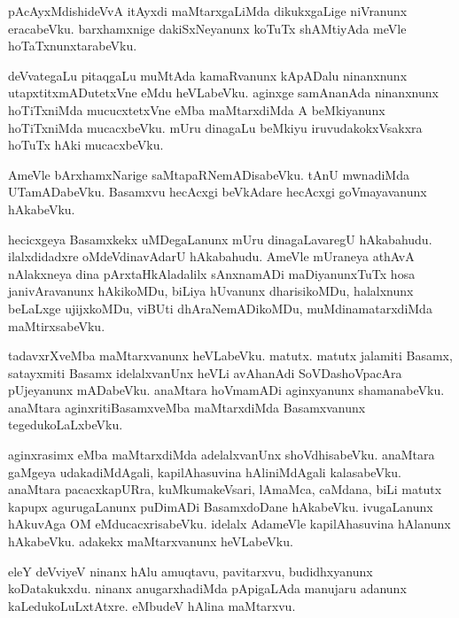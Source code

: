 \documentclass{article}
\begin{document}
\begin{mn}
pAcAyxMdishideVvA  itAyxdi  maMtarxgaLiMda  dikukxgaLige  niVranunx  eracabeVku.  barxhamxnige  
dakiSxNeyanunx  koTuTx  shAMtiyAda  meVle  hoTaTxnunxtarabeVku.  
\end{mn}

\begin{mn}
deVvategaLu  pitaqgaLu  muMtAda  kamaRvanunx  kApADalu  ninanxnunx  utapxtitxmADutetxVne  eMdu  heVLabeVku.  
aginxge  samAnanAda  ninanxnunx  hoTiTxniMda  mucucxtetxVne  eMba  maMtarxdiMda  A  beMkiyanunx  hoTiTxniMda  
mucacxbeVku.  mUru  dinagaLu  beMkiyu  iruvudakokxVsakxra  hoTuTx  hAki  mucacxbeVku.
\end{mn}

\begin{mn}
AmeVle  bArxhamxNarige  saMtapaRNemADisabeVku.  tAnU  mwnadiMda  UTamADabeVku.  Basamxvu  hecAcxgi  beVkAdare  
hecAcxgi  goVmayavanunx  hAkabeVku.
\end{mn}

\begin{mn}
hecicxgeya  Basamxkekx  uMDegaLanunx  mUru  dinagaLavaregU  hAkabahudu.  ilalxdidadxre  oMdeVdinavAdarU  hAkabahudu.  
AmeVle  mUraneya  athAvA  nAlakxneya  dina  pArxtaHkAladalilx  sAnxnamADi  maDiyanunxTuTx  hosa  janivAravanunx  hAkikoMDu,  
biLiya  hUvanunx  dharisikoMDu,  halalxnunx  beLaLxge  ujijxkoMDu,  viBUti  dhAraNemADikoMDu,  muMdinamatarxdiMda  maMtirxsabeVku.
\end{mn}

\begin{mn}
tadavxrXveMba  maMtarxvanunx  heVLabeVku.  matutx.  matutx  jalamiti  Basamx,  satayxmiti  Basamx  
idelalxvanUnx  heVLi  avAhanAdi  SoVDashoVpacAra  pUjeyanunx  mADabeVku.  anaMtara  hoVmamADi  
aginxyanunx  shamanabeVku.  anaMtara  aginxritiBasamxveMba  maMtarxdiMda  Basamxvanunx  tegedukoLaLxbeVku.
\end{mn}

\begin{mn}
aginxrasimx  eMba  maMtarxdiMda  adelalxvanUnx  shoVdhisabeVku.  anaMtara  gaMgeya  udakadiMdAgali,  
kapilAhasuvina  hAliniMdAgali  kalasabeVku.  anaMtara  pacacxkapURra,  kuMkumakeVsari,  lAmaMca,  caMdana,  
biLi  matutx  kapupx  agurugaLanunx  puDimADi  BasamxdoDane  hAkabeVku.  ivugaLanunx  hAkuvAga  OM  
eMducacxrisabeVku.  idelalx  AdameVle  kapilAhasuvina  hAlanunx  hAkabeVku.  adakekx  maMtarxvanunx  heVLabeVku.
\end{mn}

\begin{mn}
eleY  deVviyeV  ninanx  hAlu  amuqtavu,  pavitarxvu,  budidhxyanunx  koDatakukxdu.  ninanx  anugarxhadiMda  
pApigaLAda  manujaru  adanunx  kaLedukoLuLxtAtxre.  eMbudeV  hAlina  maMtarxvu.
\end{mn}
\end{document}
